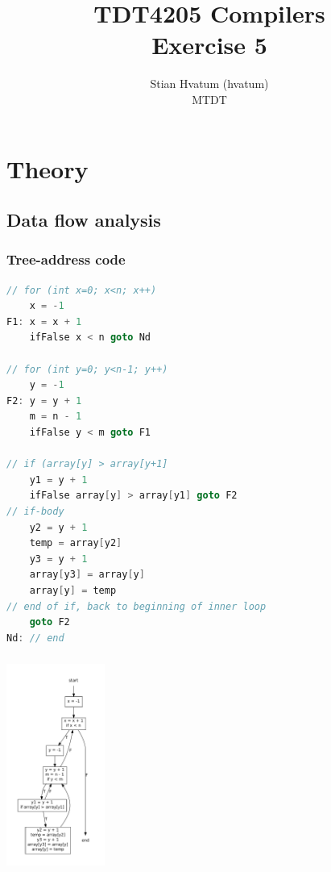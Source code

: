 \documentclass[english,a4paper]{scrartcl}
\title{TDT4205 Compilers\\
\Huge Exercise 5}
\author{Stian Hvatum (hvatum)\\MTDT}
\begin{document}
\maketitle
\tableofcontents
\newpage
\section{Theory}
\begin{minipage}[b]{0.5\linewidth}
 \centering
\subsection{Data flow analysis}
\subsubsection{Tree-address code}
\begin{lstlisting}[language=C,morekeywords={ifFalse}]
// for (int x=0; x<n; x++)
	x = -1
F1:	x = x + 1
	ifFalse x < n goto Nd

// for (int y=0; y<n-1; y++)	
	y = -1
F2:	y = y + 1
	m = n - 1
	ifFalse y < m goto F1
	
// if (array[y] > array[y+1]	
	y1 = y + 1
	ifFalse array[y] > array[y1] goto F2
// if-body
	y2 = y + 1
	temp = array[y2]
	y3 = y + 1
	array[y3] = array[y]
	array[y] = temp
// end of if, back to beginning of inner loop
	goto F2
Nd:	// end
\end{lstlisting}
 
 \end{minipage}
 \hspace{0.5cm}
 \begin{minipage}[b]{0.5\linewidth}
 \centering
\subsubsection{}
\includegraphics[height=250px]{flowgraph.pdf}

 \end{minipage}
\end{document}
